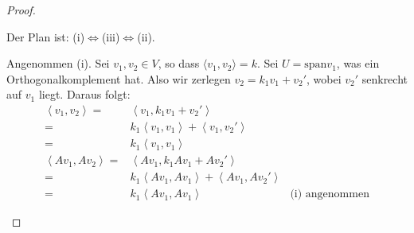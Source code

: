 \begin{proof}
	\begin{parts}
	\item Der Plan ist: (i)$\iff$(iii)$\iff$(ii).

		Angenommen (i). Sei $v_1,v_2\in V$, so dass $\langle v_1,v_2\rangle=k$. Sei $U=\text{span}v_1$, was ein Orthogonalkomplement hat. Also wir zerlegen $v_2=k_1v_1+v_2'$, wobei $v_2'$ senkrecht auf $v_1$ liegt. Daraus folgt:
		\begin{align*}
			\left<v_1,v_2 \right> =&\left<v_1,k_1 v_1+v_2' \right>\\
			=&k_1\left<v_1,v_1 \right>+\left<v_1,v_2' \right>\\
			=&k_1\left<v_1,v_1 \right>\\
			\left<Av_1,Av_2 \right> =& \left<Av_1,k_1 Av_1+Av_2' \right>\\
			=&k_1 \left<Av_1,Av_1 \right>+ \left<Av_1,Av_2' \right>\\
			=&k_1\left<Av_1,Av_1 \right> & \text{(i) angenommen}
		\end{align*}
	\end{parts}
\end{proof}

